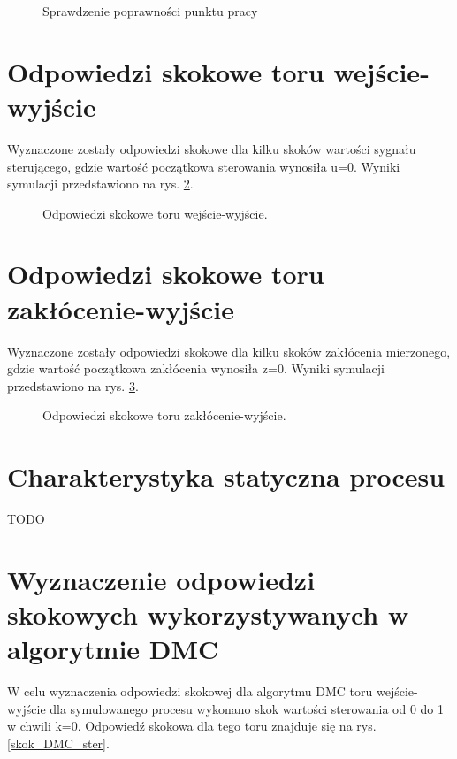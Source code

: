 \documentclass[a4paper,titlepage,11pt,twosides,floatssmall]{mwrep}
\begin{document}
\begin{figure}[H]
	\centering
	
	\caption{Sprawdzenie poprawności punktu pracy}
	\label{punkt_pracy}
\end{figure}


\section{Odpowiedzi skokowe toru wejście-wyjście}
Wyznaczone zostały odpowiedzi skokowe dla kilku skoków wartości sygnału sterującego, gdzie wartość początkowa sterowania wynosiła u=0. Wyniki symulacji przedstawiono na rys. \ref{odp_skok_wej}.

\begin{figure}[H]
	\centering
	
	\caption{Odpowiedzi skokowe toru wejście-wyjście.}
	\label{odp_skok_wej}
\end{figure}



\section{Odpowiedzi skokowe toru zakłócenie-wyjście}
Wyznaczone zostały odpowiedzi skokowe dla kilku skoków zakłócenia mierzonego, gdzie wartość początkowa zakłócenia wynosiła z=0. Wyniki symulacji przedstawiono na rys. \ref{odp_skok_zak}.

\begin{figure}[H]
	\centering
	
	\caption{Odpowiedzi skokowe toru zakłócenie-wyjście.}
	\label{odp_skok_zak}
\end{figure}


\section{Charakterystyka statyczna procesu}
TODO

\section{Wyznaczenie odpowiedzi skokowych wykorzystywanych w algorytmie DMC}

W celu wyznaczenia odpowiedzi skokowej dla algorytmu DMC toru wejście-wyjście dla symulowanego procesu wykonano skok wartości sterowania od 0 do 1 w chwili k=0. Odpowiedź skokowa dla tego toru znajduje się na rys. \ref{skok_DMC_ster}.
\end{document}
